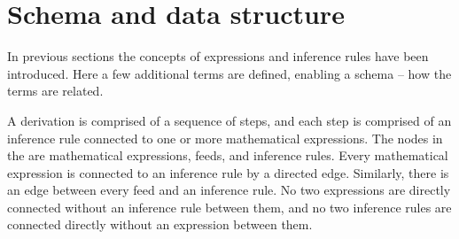 \section{Schema and data structure\label{sec:schema}}

In previous sections the concepts of expressions and inference rules have been introduced. Here a few additional terms are defined, enabling a schema -- how the terms are related.

A \gls{derivation} is comprised of a sequence of \glspl{step}, and each step is comprised of an inference rule connected to one or more mathematical expressions.
The nodes in the \pdg{} are mathematical expressions, feeds, and inference rules. Every mathematical expression is connected to an inference rule by a directed edge. Similarly, there is an edge between every feed and an inference rule. No two expressions are directly connected without an inference rule between them, and no two inference rules are connected directly without an expression between them. 